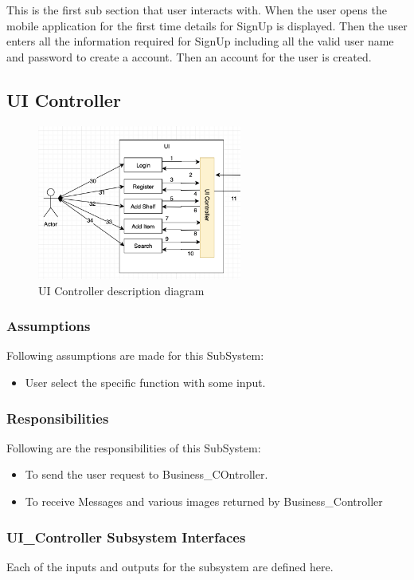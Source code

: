 This is the first sub section that user interacts with. When the user opens the mobile application for the first time details for SignUp is displayed. Then the user enters all the information required for SignUp including all the valid user name and password to create a account. Then an account for the user is created.

\subsection{UI Controller}


\begin{figure}[h!]
	\centering
 	\includegraphics[width=0.60\textwidth]{images/uicontroller}
 \caption{UI Controller description diagram}
\end{figure}

\subsubsection{Assumptions}
Following assumptions are made for this SubSystem:
\begin{itemize}
    \item User select the specific function with some input.
\end{itemize}

\subsubsection{Responsibilities}
Following are the responsibilities of this SubSystem:
\begin{itemize}
    \item To send the user request to Business\_COntroller.
    \item To receive Messages and various images returned by Business\_Controller 
\end{itemize}

\subsubsection{UI\_Controller Subsystem Interfaces}
Each of the inputs and outputs for the subsystem are defined here.

